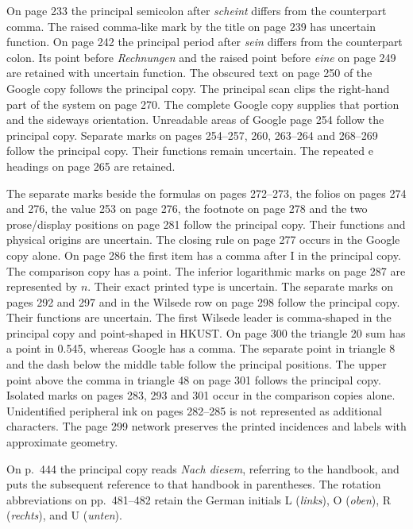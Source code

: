 On page 233 the principal semicolon after \textit{scheint} differs from the counterpart comma. The raised comma-like mark by the title on page 239 has uncertain function.
On page 242 the principal period after \textit{sein} differs from the counterpart colon.
Its point before \textit{Rechnungen} and the raised point before \textit{eine} on page 249 are
retained with uncertain function. The obscured text on page 250 of the Google copy follows the principal copy.
The principal scan clips the right-hand part of the system on page 270. The complete Google copy supplies that portion and the sideways orientation.
Unreadable areas of Google page 254 follow the principal copy. Separate marks
on pages 254--257, 260, 263--264 and 268--269 follow the principal copy. Their functions remain uncertain. The repeated e headings on page 265 are retained.

The separate marks beside the formulas on pages 272--273, the folios
on pages 274 and 276, the value 253 on page 276, the footnote on
page 278 and the two prose/display positions on page 281 follow the
principal copy. Their functions and physical origins are uncertain.
The closing rule on page 277 occurs in the Google copy alone.
On page 286 the first item has a comma after I in the principal copy. The comparison copy has a point. The inferior logarithmic marks on
page 287 are represented by \(n\). Their exact printed type is uncertain.
The separate marks on pages 292 and 297 and in the Wilsede row on
page 298 follow the principal copy. Their functions are uncertain.
The first Wilsede leader is comma-shaped in the principal copy and
point-shaped in HKUST. On page 300 the triangle 20 sum has a point
in 0.545, whereas Google has a comma. The separate point in triangle 8
and the dash below the middle table follow the principal positions.
The upper point above the comma in triangle 48 on page 301 follows
the principal copy. Isolated marks on pages 283, 293 and 301 occur in the comparison copies alone. Unidentified peripheral ink on pages 282--285
is not represented as additional characters. The page 299 network
preserves the printed incidences and labels with approximate geometry.

On p.~444 the principal copy reads \textit{Nach diesem}, referring to the handbook, and puts the subsequent reference to that handbook in parentheses. The rotation abbreviations on pp.~481--482 retain the German initials L (\textit{links}), O (\textit{oben}), R (\textit{rechts}), and U (\textit{unten}).

